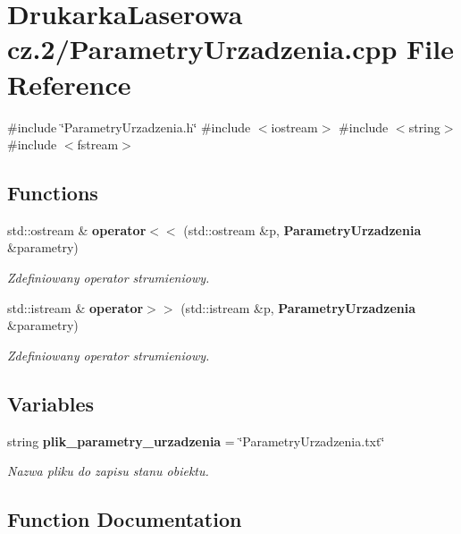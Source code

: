 \section{Drukarka\+Laserowa cz.2/\+Parametry\+Urzadzenia.cpp File Reference}
\label{_parametry_urzadzenia_8cpp}
{\ttfamily \#include \char`\"{}Parametry\+Urzadzenia.\+h\char`\"{}}\newline
{\ttfamily \#include $<$iostream$>$}\newline
{\ttfamily \#include $<$string$>$}\newline
{\ttfamily \#include $<$fstream$>$}\newline
\subsection*{Functions}
\begin{DoxyCompactItemize}
\item 
std\+::ostream \& \textbf{ operator$<$$<$} (std\+::ostream \&p, \textbf{ Parametry\+Urzadzenia} \&parametry)
\begin{DoxyCompactList}\small\item\em Zdefiniowany operator strumieniowy. \end{DoxyCompactList}\item 
std\+::istream \& \textbf{ operator$>$$>$} (std\+::istream \&p, \textbf{ Parametry\+Urzadzenia} \&parametry)
\begin{DoxyCompactList}\small\item\em Zdefiniowany operator strumieniowy. \end{DoxyCompactList}\end{DoxyCompactItemize}
\subsection*{Variables}
\begin{DoxyCompactItemize}
\item 
string \textbf{ plik\+\_\+parametry\+\_\+urzadzenia} = \char`\"{}Parametry\+Urzadzenia.\+txt\char`\"{}
\begin{DoxyCompactList}\small\item\em Nazwa pliku do zapisu stanu obiektu. \end{DoxyCompactList}\end{DoxyCompactItemize}


\subsection{Function Documentation}
\mbox{\label{_parametry_urzadzenia_8cpp_aa482d2aa1e55c6e5d099eb3a47057d33}} 
